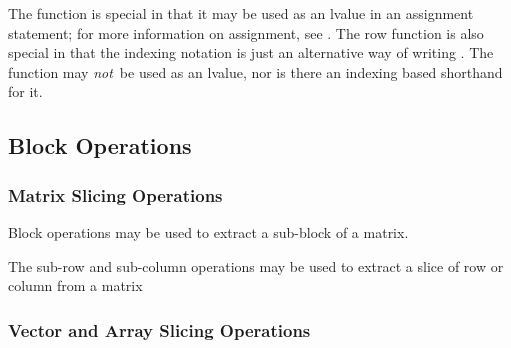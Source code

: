 \begin{description}
%
%
%
\end{description}

The  function is special in that it may be used as an lvalue
in an assignment statement; for more information on assignment, see
.  The row function is also special
in that the indexing notation  is just an alternative way
of writing .  The  function may {\it not}\, be
used as an lvalue, nor is there an indexing based shorthand for it.


\subsection{Block Operations}

\subsubsection{Matrix Slicing Operations}

Block operations may be used to extract a sub-block of a matrix.

\begin{description}
\end{description}
%
The sub-row and sub-column operations may be used to extract a
slice of row or column from a matrix
%
\begin{description}
%
%
%
\end{description}

\subsubsection{Vector and Array Slicing Operations}

